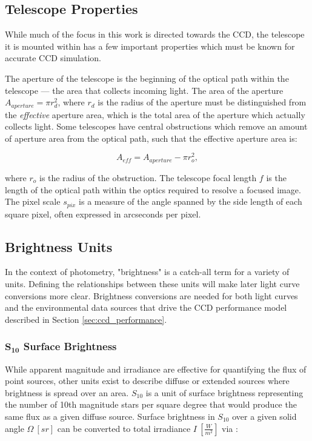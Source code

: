 \subsection{Telescope Properties} \label{sec:telescope_properties}

While much of the focus in this work is directed towards the CCD, the telescope it is mounted within has a few important properties which must be known for accurate CCD simulation. 

The aperture of the telescope is the beginning of the optical path within the telescope --- the area that collects incoming light. The area of the aperture $A_{aperture} = \pi r_{d}^2$, where $r_d$ is the radius of the aperture must be distinguished from the \textit{effective} aperture area, which is the total area of the aperture which actually collects light. Some telescopes have central obstructions which remove an amount of aperture area from the optical path, such that the effective aperture area is:

\begin{equation}
  A_{eff} = A_{aperture} - \pi r_{o}^2,
\end{equation}

where $r_o$ is the radius of the obstruction. The telescope focal length $f$ is the length of the optical path within the optics required to resolve a focused image. The pixel scale $s_{pix}$ is a measure of the angle spanned by the side length of each square pixel, often expressed in arcseconds per pixel. 

\subsection{Brightness Units}

In the context of photometry, "brightness" is a catch-all term for a variety of units. Defining the relationships between these units will make later light curve conversions more clear. Brightness conversions are needed for both light curves and the environmental data sources that drive the CCD performance model described in Section \ref{sec:ccd_performance}.

\subsubsection{$\mathbf{S_{10}}$ Surface Brightness}

While apparent magnitude and irradiance are effective for quantifying the flux of point sources, other units exist
to describe diffuse or extended sources where brightness is spread over an
area. $S_{10}$ is a unit of surface brightness representing the number of 10th magnitude stars per square degree that would produce the same flux as a given diffuse source.
Surface brightness in $S_{10}$ over a given solid angle $\Omega \: \left[ sr \right]$ can be converted to total irradiance $I \: \left[ \frac{W}{m^2} \right]$ via \cite{krag2003}:

